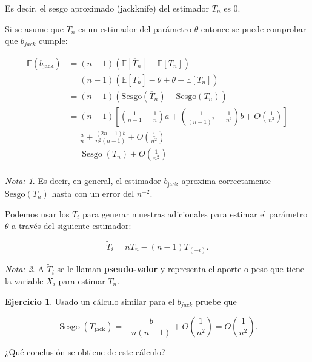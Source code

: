 \documentclass[
  12pt,
]{book}
\theoremstyle{definition}
\theoremstyle{definition}
\theoremstyle{definition}
\newtheorem{exercise}{Ejercicio}[chapter]
\theoremstyle{definition}
\theoremstyle{remark}
\newtheorem*{remark}{Nota: }
\begin{document}
Es decir, el sesgo aproximado (jackknife) del estimador \(T_n\) es 0.

Si se asume que \(T_n\) es un estimador del parámetro \(\theta\) entonce se puede comprobar que \(b_{jack}\) cumple:

\begin{align*}
\mathbb{E}\left(b_{\text {jack}}\right)
&= (n-1)\left(\mathbb{E}\left[\overline{T}_{n}\right] -
\mathbb{E}\left[T_{n}\right]\right) \\
&= (n-1)\left(\mathbb{E}\left[\overline{T}_{n}\right] - \theta +
\theta - \mathbb{E}\left[T_{n}\right]\right) \\
& =(n-1)\left(\mathrm{Sesgo} \left(\overline{T}_{n}\right)
-\mathrm{Sesgo}\left(T_{n}\right)\right) \\
& =(n-1)\left[\left(\frac{1}{n-1}
-\frac{1}{n}\right)
a+\left(\frac{1}{(n-1)^{2}}
-\frac{1}{n^{2}}\right) b+O\left(\frac{1}{n^{3}}\right)\right] \\
& =\frac{a}{n}
+\frac{(2 n-1) b}{n^{2}(n-1)}
+O\left(\frac{1}{n^{2}}\right) \\
& =\operatorname{Sesgo}\left(T_{n}\right)
+O\left(\frac{1}{n^{2}}\right)\\
\end{align*}

\begin{remark}
Es decir, en general, el estimador \(b_{\text{jack}}\) aproxima
correctamente \(\mathrm{Sesgo}\left( T_{n} \right)\) hasta con un
error del \(n^{-2}\).
\end{remark}

Podemos usar los \(T_i\) para generar muestras adicionales para
estimar el parámetro \(\theta\) a través del siguiente estimador:

\[
\widetilde{T}_{i}=n T_{n}-(n-1) T_{(-i)}.
\]

\begin{remark}
A \(\widetilde{T}_{i}\) se le llaman \textbf{pseudo-valor} y
representa el aporte o peso que tiene la variable \(X_{i}\) para
estimar \(T_{n}\).
\end{remark}

\begin{exercise}
\protect\hypertarget{exr:unnamed-chunk-78}{}\label{exr:unnamed-chunk-78}Usado un cálculo similar para el \(b_{jack}\) pruebe que

\[
\operatorname{Sesgo}\left(T_{\text {jack}
}\right)=-\frac{b}{n(n-1)}+O\left(\frac{1}{n^{2}}\right)=O\left(\frac{1}{n^{2}}\right).
\]

¿Qué conclusión se obtiene de este cálculo?
\end{exercise}
\end{document}
